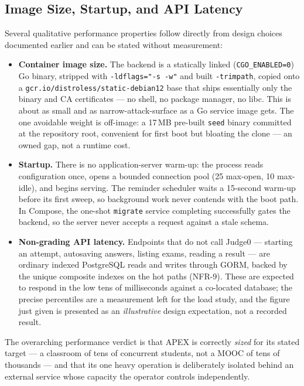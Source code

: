 \subsection{Image Size, Startup, and API Latency}
\label{sec:res-images}

Several qualitative performance properties follow directly from design choices
documented earlier and can be stated without measurement:

\begin{itemize}[leftmargin=1.4em]
  \item \textbf{Container image size.} The backend is a statically linked
        (\texttt{CGO\_ENABLED=0}) Go binary, stripped with \texttt{-ldflags="-s -w"}
        and built \texttt{-trimpath}, copied onto a
        \texttt{gcr.io/distroless/static-debian12} base that ships essentially only
        the binary and CA certificates --- no shell, no package manager, no libc.
        This is about as small and as narrow-attack-surface as a Go service image
        gets. The one avoidable weight is off-image: a 17\,MB pre-built \texttt{seed}
        binary committed at the repository root, convenient for first boot but
        bloating the clone --- an owned gap, not a runtime cost.
  \item \textbf{Startup.} There is no application-server warm-up: the process reads
        configuration once, opens a bounded connection pool (25 max-open, 10
        max-idle), and begins serving. The reminder scheduler waits a 15-second
        warm-up before its first sweep, so background work never contends with the
        boot path. In Compose, the one-shot \texttt{migrate} service completing
        successfully gates the backend, so the server never accepts a request against
        a stale schema.
  \item \textbf{Non-grading API latency.} Endpoints that do not call Judge0 ---
        starting an attempt, autosaving answers, listing exams, reading a result ---
        are ordinary indexed PostgreSQL reads and writes through GORM, backed by the
        unique composite indexes on the hot paths (NFR-9). These are expected to
        respond in the low tens of milliseconds against a co-located database; the
        precise percentiles are a measurement left for the load study, and the figure
        just given is presented as an \emph{illustrative} design expectation, not a
        recorded result.
\end{itemize}

The overarching performance verdict is that APEX is correctly \emph{sized} for its
stated target --- a classroom of tens of concurrent students, not a MOOC of tens of
thousands --- and that its one heavy operation is deliberately isolated behind an
external service whose capacity the operator controls independently.

